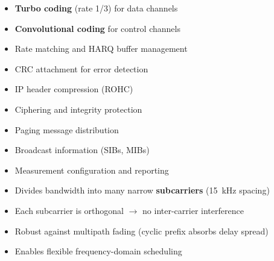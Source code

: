 \begin{itemize}
\tightlist
\item
  \textbf{Turbo coding} (rate 1/\allowbreak{}3) for data channels
\item
  \textbf{Convolutional coding} for control channels
\item
  Rate matching and HARQ buffer management
\item
  CRC attachment for error detection
\end{itemize}


\begin{itemize}
\tightlist
\item
  IP header compression (ROHC)
\item
  Ciphering and integrity protection
\item
  Paging message distribution
\item
  Broadcast information (SIBs, MIBs)
\item
  Measurement configuration and reporting
\end{itemize}




\CNchained{}










\CNchained{}

\CNchained{}

\begin{itemize}
\tightlist
\item
  Divides bandwidth into many narrow \textbf{subcarriers} (15~kHz spacing)
\item
  Each subcarrier is orthogonal \ensuremath{\to} no inter-carrier interference
\item
  Robust against multipath fading (cyclic prefix absorbs delay spread)
\item
  Enables flexible frequency-domain scheduling
\end{itemize}

